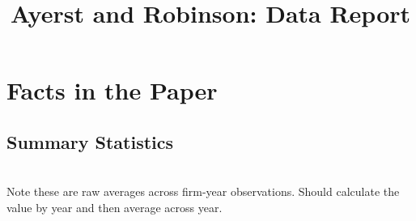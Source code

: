 \documentclass[12pt,notitlepage]{article}
\title{Ayerst and Robinson: Data Report}
\author{}
\date{}
\begin{document}
\maketitle
\tableofcontents
\listoffigures
\FloatBarrier



\section{Facts in the Paper} %
\label{sec:paper}


\FloatBarrier
\subsection{Summary Statistics} %
\label{sec:summary_statistics}
\FloatBarrier

\begin{table}[!htpb]
\caption{French Summary Statistics}
\tabularnewline \\
Note these are raw averages across firm-year observations. Should calculate the value by year and then average across year.
\end{table}
\end{document}
